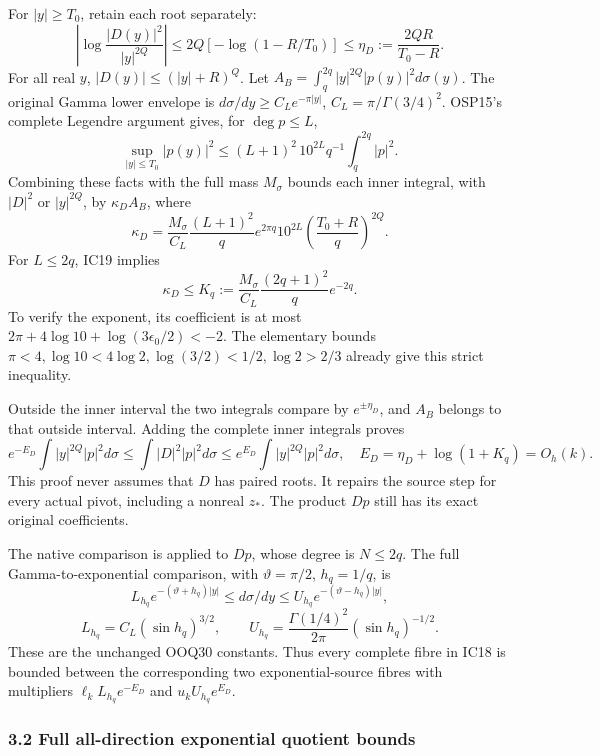 \documentclass[11pt]{article}
\begin{document}
For \(|y|\ge T_0\), retain each root separately: \[
\left|\log\frac{|D(y)|^2}{|y|^{2Q}}\right|
\le 2Q[-\log(1-R/T_0)]
\le \eta_D:=\frac{2QR}{T_0-R}.
\tag{IC20}
\] For all real \(y\), \(|D(y)|\le(|y|+R)^Q\). Let \(A_B=\int_q^{2q}|y|^{2Q}|p(y)|^2d\sigma(y)\). The original Gamma lower envelope is \(d\sigma/dy\ge C_Le^{-\pi|y|}\), \(C_L=\pi/\Gamma(3/4)^2\). OSP15's complete Legendre argument gives, for \(\deg p\le L\), \[
\sup_{|y|\le T_0}|p(y)|^2
\le (L+1)^2\,10^{2L}q^{-1}\int_q^{2q}|p|^2.
\] Combining these facts with the full mass \(M_\sigma\) bounds each inner integral, with \(|D|^2\) or \(|y|^{2Q}\), by \(\kappa_D A_B\), where \[
\kappa_D=
\frac{M_\sigma}{C_L}\frac{(L+1)^2}{q}
e^{2\pi q}10^{2L}\left(\frac{T_0+R}{q}\right)^{2Q}.
\tag{IC21}
\] For \(L\le2q\), IC19 implies \[
\kappa_D\le K_q:=
\frac{M_\sigma}{C_L}\frac{(2q+1)^2}{q}e^{-2q}.
\] To verify the exponent, its coefficient is at most \(2\pi+4\log10+\log(3\epsilon_0/2)<-2\). The elementary bounds \(\pi<4,\log10<4\log2,\log(3/2)<1/2,\log2>2/3\) already give this strict inequality.

Outside the inner interval the two integrals compare by \(e^{\pm\eta_D}\), and \(A_B\) belongs to that outside interval. Adding the complete inner integrals proves \[
e^{-E_D}\int |y|^{2Q}|p|^2d\sigma
\le\int |D|^2|p|^2d\sigma
\le e^{E_D}\int |y|^{2Q}|p|^2d\sigma,\quad
E_D=\eta_D+\log(1+K_q)=O_h(k).
\tag{IC22}
\] This proof never assumes that \(D\) has paired roots. It repairs the source step for every actual pivot, including a nonreal \(z_*\). The product \(Dp\) still has its exact original coefficients.

The native comparison is applied to \(Dp\), whose degree is \(N\le2q\). The full Gamma-to-exponential comparison, with \(\vartheta=\pi/2\), \(h_q=1/q\), is \[
L_{h_q}e^{-(\vartheta+h_q)|y|}
\le d\sigma/dy\le U_{h_q}e^{-(\vartheta-h_q)|y|},
\] \[
L_{h_q}=C_L(\sin h_q)^{3/2},\qquad
U_{h_q}=\frac{\Gamma(1/4)^2}{2\pi}(\sin h_q)^{-1/2}.
\tag{IC23}
\] These are the unchanged OOQ30 constants. Thus every complete fibre in IC18 is bounded between the corresponding two exponential-source fibres with multipliers \(\ell_k L_{h_q}e^{-E_D}\) and \(u_kU_{h_q}e^{E_D}\).

\subsubsection{3.2 Full all-direction exponential quotient bounds}\label{full-all-direction-exponential-quotient-bounds}
\end{document}
